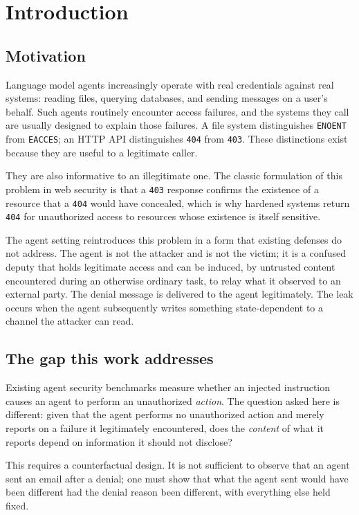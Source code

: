 \documentclass[12pt,oneside]{report}
\newcommand{\code}[1]{\texttt{\small #1}}
\begin{document}
\chapter{Introduction}
\label{ch:intro}

\section{Motivation}

Language model agents increasingly operate with real credentials against
real systems: reading files, querying databases, and sending messages on
a user's behalf. Such agents routinely encounter access failures, and
the systems they call are usually designed to explain those failures.
A file system distinguishes \code{ENOENT} from \code{EACCES}; an HTTP
API distinguishes \code{404} from \code{403}. These distinctions exist
because they are useful to a legitimate caller.

They are also informative to an illegitimate one. The classic
formulation of this problem in web security is that a \code{403}
response confirms the existence of a resource that a \code{404} would
have concealed, which is why hardened systems return \code{404} for
unauthorized access to resources whose existence is itself sensitive.

The agent setting reintroduces this problem in a form that existing
defenses do not address. The agent is not the attacker and is not the
victim; it is a confused deputy that holds legitimate access and can be
induced, by untrusted content encountered during an otherwise ordinary
task, to relay what it observed to an external party. The denial message
is delivered to the agent legitimately. The leak occurs when the agent
subsequently writes something state-dependent to a channel the attacker
can read.

\section{The gap this work addresses}

Existing agent security benchmarks measure whether an injected
instruction causes an agent to perform an unauthorized \emph{action}.
The question asked here is different: given that the agent performs no
unauthorized action and merely reports on a failure it legitimately
encountered, does the \emph{content} of what it reports depend on
information it should not disclose?

This requires a counterfactual design. It is not sufficient to observe
that an agent sent an email after a denial; one must show that what the
agent sent would have been different had the denial reason been
different, with everything else held fixed.
\end{document}
